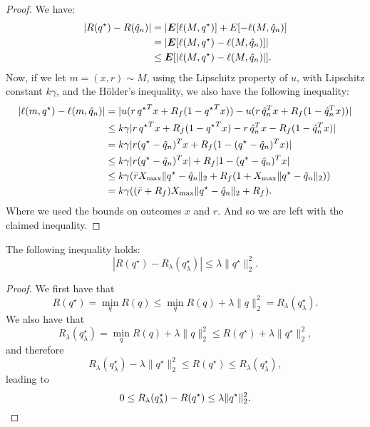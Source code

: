 \begin{proof}
We have:
\begin{align*}
  |R({q^\star}) - R({\hat q}_n)| &= |\bm E[\ell(M,{q^\star})] + E[-\ell(M,{\hat q}_n)]\\
                                           & = |\bm E[\ell(M,{q^\star}) - \ell(M,{\hat q}_n)]|\\
                                           & \leq \bm E[|\ell(M,{q^\star}) - \ell(M,{\hat q}_n)|].
\end{align*}
Now, if we let $m=(x,r)\sim M$, using the Lipschitz property of $u$, with Lipschitz
constant $k\gamma$, and the Hölder's inequality, we also have the following inequality:
\begin{align*}
  |\ell(m,{q^\star}) - \ell(m,{\hat q}_n)| 
  &= |u(r\,{q^\star}^Tx + R_f(1-{q^\star}^{T}x)) - u(r\,{\hat q}_n^Tx + R_f(1-{\hat q}_n^{T}x))| \\
  & \leq k\gamma|r\,{q^\star}^Tx + R_f(1-{q^\star}^Tx) - r\,{\hat q}_n^Tx - R_f(1-{\hat q}_n^Tx)|\\
  & = k\gamma|r({q^\star}-{\hat q}_n)^Tx + R_f(1-({q^\star}-{\hat q}_n)^Tx)|\\
  & \leq k\gamma|r({q^\star}-{\hat q}_n)^Tx| + R_f|1-({q^\star}-{\hat q}_n)^Tx|\\
  & \leq k\gamma(\bar rX_{\max} \|{q^\star}-{\hat q}_n\|_2 + R_f(1+X_{\max} \|{q^\star}-{\hat q}_n\|_2))\\
  & = k\gamma((\bar r + R_f)X_{\max} \|{q^\star} - {\hat q}_n\|_2 + R_f).
\end{align*}
Where we used the bounds on outcomes $x$ and $r$. And so we are left with the claimed
inequality. 
\end{proof}

\begin{claim}
  \label{delage_bound_claim}
  The following inequality holds:
  \begin{equation*}
    |R(q^\star) - R_\lambda(q^\star_\lambda)| \leq \lambda\|q^\star\|^2_2.
  \end{equation*}
\end{claim}
\begin{proof}
  We first have that
  \begin{equation*}
    R(q^\star) = \min_q R(q) \leq \min_q R(q) + \lambda\|q\|_2^2 = R_\lambda(q^\star_\lambda).
  \end{equation*}
  We also have that
  \begin{equation*}
    R_\lambda(q^\star_\lambda) = \min_q R(q) + \lambda\|q\|^2_2 \leq R(q^\star) + \lambda\|q^\star\|^2_2,
  \end{equation*}
  and therefore
  \begin{equation*}
    R_\lambda(q^\star_\lambda) - \lambda\|q^\star\|^2_2 \leq R(q^\star) \leq R_\lambda(q^\star_\lambda),
  \end{equation*}
  leading to
  \begin{equation*}
    0 \leq R_\lambda(q^\star_\lambda) - R(q^\star) \leq \lambda\|q^\star\|^2_2.\qedhere
  \end{equation*}
\end{proof}


